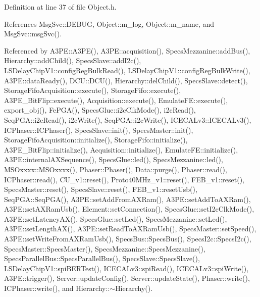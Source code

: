 Definition at line 37 of file Object.\+h.



References Msg\+Svc\+::\+D\+E\+B\+UG, Object\+::m\+\_\+log, Object\+::m\+\_\+name, and Msg\+Svc\+::msg\+Svc().



Referenced by A3\+P\+E\+::\+A3\+P\+E(), A3\+P\+E\+::acquisition(), Specs\+Mezzanine\+::add\+Bus(), Hierarchy\+::add\+Child(), Specs\+Slave\+::add\+I2c(), L\+S\+Delay\+Chip\+V1\+::config\+Reg\+Bulk\+Read(), L\+S\+Delay\+Chip\+V1\+::config\+Reg\+Bulk\+Write(), A3\+P\+E\+::data\+Ready(), D\+C\+U\+::\+D\+C\+U(), Hierarchy\+::del\+Child(), Specs\+Slave\+::detect(), Storage\+Fifo\+Acquisition\+::execute(), Storage\+Fifo\+::execute(), A3\+P\+E\+\_\+\+Bit\+Flip\+::execute(), Acquisition\+::execute(), Emulate\+F\+E\+::execute(), export\+\_\+obj(), Fe\+P\+G\+A(), Specs\+Glue\+::i2c\+Clk\+Mode(), i2c\+Read(), Seq\+P\+G\+A\+::i2c\+Read(), i2c\+Write(), Seq\+P\+G\+A\+::i2c\+Write(), I\+C\+E\+C\+A\+Lv3\+::\+I\+C\+E\+C\+A\+Lv3(), I\+C\+Phaser\+::\+I\+C\+Phaser(), Specs\+Slave\+::init(), Specs\+Master\+::init(), Storage\+Fifo\+Acquisition\+::initialize(), Storage\+Fifo\+::initialize(), A3\+P\+E\+\_\+\+Bit\+Flip\+::initialize(), Acquisition\+::initialize(), Emulate\+F\+E\+::initialize(), A3\+P\+E\+::internal\+A\+X\+Sequence(), Specs\+Glue\+::led(), Specs\+Mezzanine\+::led(), M\+S\+Oxxxx\+::\+M\+S\+Oxxxx(), Phaser\+::\+Phaser(), Data\+::purge(), Phaser\+::read(), I\+C\+Phaser\+::read(), C\+U\+\_\+v1\+::reset(), Proto40\+M\+Hz\+\_\+v1\+::reset(), F\+E\+B\+\_\+v1\+::reset(), Specs\+Master\+::reset(), Specs\+Slave\+::reset(), F\+E\+B\+\_\+v1\+::reset\+Usb(), Seq\+P\+G\+A\+::\+Seq\+P\+G\+A(), A3\+P\+E\+::set\+Add\+From\+A\+X\+Ram(), A3\+P\+E\+::set\+Add\+To\+A\+X\+Ram(), A3\+P\+E\+::set\+A\+X\+Ram\+Usb(), Element\+::set\+Connection(), Specs\+Glue\+::set\+I2c\+Clk\+Mode(), A3\+P\+E\+::set\+Latency\+A\+X(), Specs\+Glue\+::set\+Led(), Specs\+Mezzanine\+::set\+Led(), A3\+P\+E\+::set\+Length\+A\+X(), A3\+P\+E\+::set\+Read\+To\+A\+X\+Ram\+Usb(), Specs\+Master\+::set\+Speed(), A3\+P\+E\+::set\+Write\+From\+A\+X\+Ram\+Usb(), Specs\+Bus\+::\+Specs\+Bus(), Specs\+I2c\+::\+Specs\+I2c(), Specs\+Master\+::\+Specs\+Master(), Specs\+Mezzanine\+::\+Specs\+Mezzanine(), Specs\+Parallel\+Bus\+::\+Specs\+Parallel\+Bus(), Specs\+Slave\+::\+Specs\+Slave(), L\+S\+Delay\+Chip\+V1\+::spi\+B\+E\+R\+Test(), I\+C\+E\+C\+A\+Lv3\+::spi\+Read(), I\+C\+E\+C\+A\+Lv3\+::spi\+Write(), A3\+P\+E\+::trigger(), Server\+::update\+Config(), Server\+::update\+State(), Phaser\+::write(), I\+C\+Phaser\+::write(), and Hierarchy\+::$\sim$\+Hierarchy().


